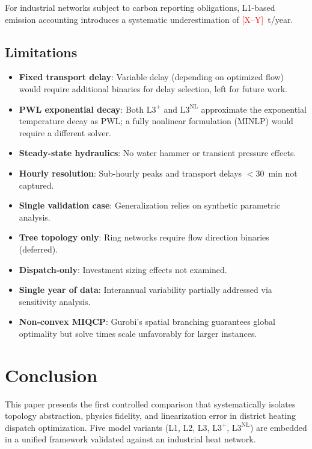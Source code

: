 \documentclass[review,3p]{elsarticle}
\newcommand{\placeholder}[1]{\textcolor{red}{[#1]}}
\newcommand{\Lplus}{\mathrm{L3}^{+}}
\newcommand{\Lnl}{\mathrm{L3}^{\mathrm{NL}}}
\begin{document}
For industrial networks subject to carbon reporting obligations,
L1-based emission accounting introduces a systematic
underestimation of \placeholder{X--Y}~t/year.

\subsection{Limitations}
\label{sec:discussion_limitations}

\begin{itemize}[nosep]
    \item \textbf{Fixed transport delay}: Variable delay (depending
    on optimized flow) would require additional binaries for delay
    selection, left for future work.
    \item \textbf{PWL exponential decay}: Both $\Lplus$ and $\Lnl$
    approximate the exponential temperature decay as PWL; a fully
    nonlinear formulation (MINLP) would require a different solver.
    \item \textbf{Steady-state hydraulics}: No water hammer or
    transient pressure effects.
    \item \textbf{Hourly resolution}: Sub-hourly peaks and
    transport delays $<$30~min not captured.
    \item \textbf{Single validation case}: Generalization relies on
    synthetic parametric analysis.
    \item \textbf{Tree topology only}: Ring networks require flow
    direction binaries (deferred).
    \item \textbf{Dispatch-only}: Investment sizing effects not
    examined.
    \item \textbf{Single year of data}: Interannual variability
    partially addressed via sensitivity analysis.
    \item \textbf{Non-convex MIQCP}: Gurobi's spatial branching
    guarantees global optimality but solve times scale
    unfavorably for larger instances.
\end{itemize}

\section{Conclusion}
\label{sec:conclusion}

This paper presents the first controlled comparison that
systematically isolates topology abstraction, physics fidelity, and
linearization error in district heating dispatch optimization. Five
model variants (L1, L2, L3, $\Lplus$, $\Lnl$) are embedded in a
unified framework validated against an industrial heat network.
\end{document}
